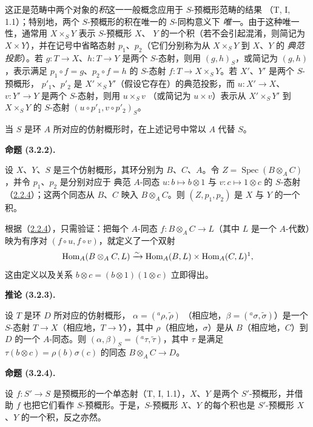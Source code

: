 \documentclass[UTF8,fontset=none,11pt,oneside,openany]{ctexbook}
\newenvironment{proposition}[1][]{%
  \par\medskip\noindent\textbf{命题 (#1).}\ %
}{\par}
\newenvironment{corollary}[1][]{%
  \par\medskip\noindent\textbf{推论 (#1).}\ %
}{\par}
\let\EGAOriginalLabel\label
\renewcommand{\label}[1]{\phantomsection\EGAOriginalLabel{#1}}
\begin{document}
这正是范畴中两个对象的\emph{积}这一一般概念应用于 $S$-预概形范畴的结果
（T, I, 1.1）；特别地，两个 $S$-预概形的积在唯一的 $S$-同构意义下
\emph{唯一}。由于这种唯一性，通常用 $X\times_S Y$ 表示 $S$-预概形 $X$、
$Y$ 的一个积（若不会引起混淆，则简记为 $X\times Y$），并在记号中省略态射
$p_1$、$p_2$（它们分别称为从 $X\times_S Y$ 到 $X$、$Y$ 的
\emph{典范投影}）。若 $g:T\to X$、$h:T\to Y$ 是两个 $S$-态射，则用
$(g,h)_S$，或简记为 $(g,h)$，表示满足 $p_1\circ f=g$、$p_2\circ f=h$ 的
$S$-态射 $f:T\to X\times_S Y$。若 $X'$、$Y'$ 是两个 $S$-预概形，
$p'_1$、$p'_2$ 是 $X'\times_S Y'$（假设它存在）的典范投影，而
$u:X'\to X$、$v:Y'\to Y$ 是两个 $S$-态射，则用 $u\times_S v$
（或简记为 $u\times v$）表示从 $X'\times_S Y'$ 到 $X\times_S Y$ 的
$S$-态射 $(u\circ p'_1,v\circ p'_2)_S$。

当 $S$ 是环 $A$ 所对应的仿射概形时，在上述记号中常以 $A$ 代替 $S$。

\begin{proposition}[3.2.2]
\label{I.3.2.2-fr}
设 $X$、$Y$、$S$ 是三个仿射概形，其环分别为 $B$、$C$、$A$。令
$Z=\operatorname{Spec}(B\otimes_A C)$，并令 $p_1$、$p_2$ 是分别对应于
典范 $A$-同态 $u:b\mapsto b\otimes1$ 与 $v:c\mapsto1\otimes c$ 的
$S$-态射（\hyperref[I.2.2.4-fr]{2.2.4}）；这两个同态从 $B$、$C$ 映入
$B\otimes_A C$。则 $(Z,p_1,p_2)$ 是 $X$ 与 $Y$ 的一个积。
\end{proposition}

根据（\hyperref[I.2.2.4-fr]{2.2.4}），只需验证：把每个 $A$-同态
$f:B\otimes_A C\to L$（其中 $L$ 是一个 $A$-代数）映为有序对
$(f\circ u,f\circ v)$，就定义了一个双射
\[
  \operatorname{Hom}_A(B\otimes_A C,L)\xrightarrow{\sim}
  \operatorname{Hom}_A(B,L)\times\operatorname{Hom}_A(C,L)\footnotemark,
\]
这由定义以及关系 $b\otimes c=(b\otimes1)(1\otimes c)$ 立即得出。

\begin{corollary}[3.2.3]
\label{I.3.2.3-fr}
设 $T$ 是环 $D$ 所对应的仿射概形，
$\alpha=({}^a\rho,\widetilde{\rho})$
（相应地，$\beta=({}^a\sigma,\widetilde{\sigma})$）是一个 $S$-态射
$T\to X$（相应地，$T\to Y$），其中 $\rho$（相应地，$\sigma$）是从
$B$（相应地，$C$）到 $D$ 的一个 $A$-同态。则
$(\alpha,\beta)_S=({}^a\tau,\widetilde{\tau})$，其中 $\tau$ 是满足
$\tau(b\otimes c)=\rho(b)\sigma(c)$ 的同态 $B\otimes_A C\to D$。
\end{corollary}

\begin{proposition}[3.2.4]
\label{I.3.2.4-fr}
设 $f:S'\to S$ 是预概形的一个单态射（T, I, 1.1），$X$、$Y$ 是两个
$S'$-预概形，并借助 $f$ 也把它们看作 $S$-预概形。于是，$S$-预概形
$X$、$Y$ 的每个积也是 $S'$-预概形 $X$、$Y$ 的一个积，反之亦然。
\end{proposition}
\end{document}
